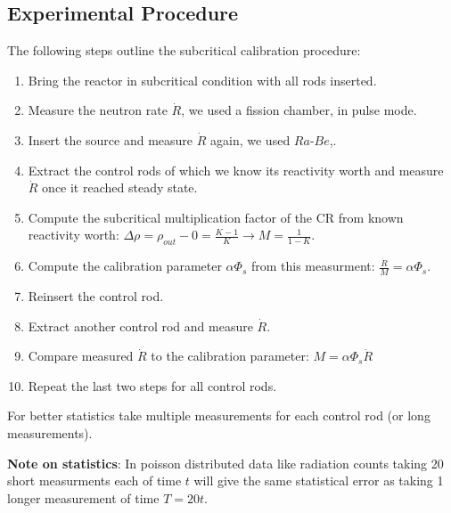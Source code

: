 \subsection{Experimental Procedure}
The following steps outline the subcritical calibration procedure:
\begin{enumerate}
    \item Bring the reactor in subcritical condition with all rods inserted.
    \item Measure the neutron rate $\dot{R}$, we used a fission chamber, in pulse mode.
    \item Insert the source and measure $\dot{R}$ again, we used $Ra\text{-}Be$,.
    \item Extract the control rods of which we know its reactivity worth and measure $\dot{R}$ once it reached steady state.
    \item Compute the subcritical multiplication factor of the CR from known reactivity worth: $\Delta \rho = \rho_{out} - 0 = \frac{K - 1}{K} \rightarrow M = \frac{1}{1 - K}$.
    \item Compute the calibration parameter $\alpha \Phi_s$ from this measurment: $\frac{\dot{R}}{M} = \alpha \Phi_s$.
    \item Reinsert the control rod.
    \item Extract another control rod and measure $\dot{R}$.
    \item Compare measured $\dot{R}$ to the calibration parameter: $M = \alpha \Phi_s \dot{R}$
    \item Repeat the last two steps for all control rods.
\end{enumerate}
For better statistics take multiple measurements for each control rod (or long measurements).

\begin{tcolorbox}[boxstyle2]
    \textbf{Note on statistics}:
    In poisson distributed data like radiation counts taking 20 short measurments each of time $t$ will give the same statistical error
    as taking 1 longer measurement of time $T = 20t$.
\end{tcolorbox}



